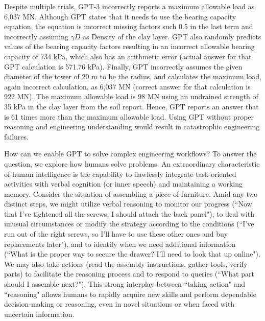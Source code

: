 \documentclass[12pt]{article}
\begin{document}
Despite multiple trials, GPT-3 incorrectly reports a maximum allowable load as 6,037 MN. Although GPT states that it needs to use the bearing capacity equation, the equation is incorrect missing factors such 0.5 in the last term and incorrectly assuming $\gamma D$ as Density of the clay layer. GPT also randomly predicts values of the bearing capacity factors resulting in an incorrect allowable bearing capacity of 734 kPa, which also has an arithmetic error (actual answer for that GPT calculation is 571.76 kPa). Finally, GPT incorrectly assumes the given diameter of the tower of 20 m to be the radius, and calculates the maximum load, again incorrect calculation, as 6,037 MN (correct answer for that calculation is 922 MN). The maximum allowable load is 98 MN using an undrained strength of 35 kPa in the clay layer from the soil report. Hence, GPT reports an answer that is 61 times more than the maximum allowable load. Using GPT without proper reasoning and engineering understanding would result in catastrophic engineering failures. 

How can we enable GPT to solve complex engineering workflows? To answer the question, we explore how humans solve problems. An extraordinary characteristic of human intelligence is the capability to flawlessly integrate task-oriented activities with verbal cognition (or inner speech) and maintaining a working memory. Consider the situation of assembling a piece of furniture. Amid any two distinct steps, we might utilize verbal reasoning to monitor our progress (``Now that I've tightened all the screws, I should attach the back panel"), to deal with unusual circumstances or modify the strategy according to the conditions (``I've run out of the right screws, so I'll have to use these other ones and buy replacements later"), and to identify when we need additional information (``What is the proper way to secure the drawer? I'll need to look that up online"). We may also take actions (read the assembly instructions, gather tools, verify parts) to facilitate the reasoning process and to respond to queries (``What part should I assemble next?"). This strong interplay between ``taking action" and ``reasoning" allows humans to rapidly acquire new skills and perform dependable decision-making or reasoning, even in novel situations or when faced with uncertain information.
\end{document}
